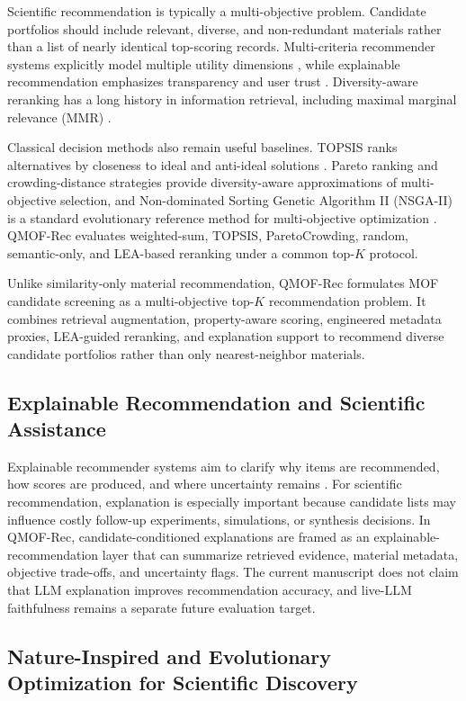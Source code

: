 \documentclass[12pt,a4paper]{article}
\begin{document}
Scientific recommendation is typically a multi-objective problem. Candidate portfolios should include relevant, diverse, and non-redundant materials rather than a list of nearly identical top-scoring records. Multi-criteria recommender systems explicitly model multiple utility dimensions \cite{adomavicius2011,jannach2014}, while explainable recommendation emphasizes transparency and user trust \cite{zhang2020}. Diversity-aware reranking has a long history in information retrieval, including maximal marginal relevance (MMR) \cite{carbonell1998}.

Classical decision methods also remain useful baselines. TOPSIS ranks alternatives by closeness to ideal and anti-ideal solutions \cite{hwang1981}. Pareto ranking and crowding-distance strategies provide diversity-aware approximations of multi-objective selection, and Non-dominated Sorting Genetic Algorithm II (NSGA-II) is a standard evolutionary reference method for multi-objective optimization \cite{deb2002}. QMOF-Rec evaluates weighted-sum, TOPSIS, ParetoCrowding, random, semantic-only, and LEA-based reranking under a common top-$K$ protocol.

Unlike similarity-only material recommendation, QMOF-Rec formulates MOF candidate screening as a multi-objective top-$K$ recommendation problem. It combines retrieval augmentation, property-aware scoring, engineered metadata proxies, LEA-guided reranking, and explanation support to recommend diverse candidate portfolios rather than only nearest-neighbor materials.

\subsection{Explainable Recommendation and Scientific Assistance}

Explainable recommender systems aim to clarify why items are recommended, how scores are produced, and where uncertainty remains \cite{zhang2020}. For scientific recommendation, explanation is especially important because candidate lists may influence costly follow-up experiments, simulations, or synthesis decisions. In QMOF-Rec, candidate-conditioned explanations are framed as an explainable-recommendation layer that can summarize retrieved evidence, material metadata, objective trade-offs, and uncertainty flags. The current manuscript does not claim that LLM explanation improves recommendation accuracy, and live-LLM faithfulness remains a separate future evaluation target.

\subsection{Nature-Inspired and Evolutionary Optimization for Scientific Discovery}
\end{document}
